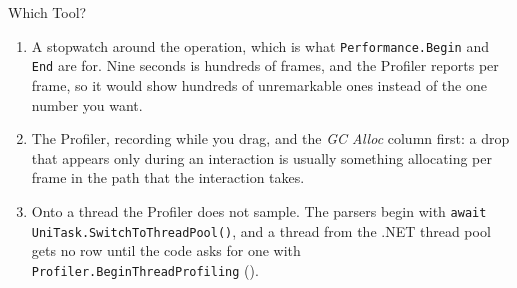 \begin{solutionframe}{Which Tool?}
  \begin{enumerate}
    \item A stopwatch around the operation, which is what
      \texttt{Performance.Begin} and \texttt{End} are for. Nine seconds is
      hundreds of frames, and the Profiler reports per frame, so it would show
      hundreds of unremarkable ones instead of the one number you want.
    \item The Profiler, recording while you drag, and the \emph{GC Alloc}
      column first: a drop that appears only during an interaction is usually
      something allocating per frame in the path that the interaction takes.
    \item Onto a thread the Profiler does not sample. The parsers begin with
      \texttt{await UniTask.SwitchToThreadPool()}, and a thread from the .NET
      thread pool gets no row until the code asks for one with
      \texttt{Profiler.BeginThreadProfiling} ().
  \end{enumerate}
\end{solutionframe}

